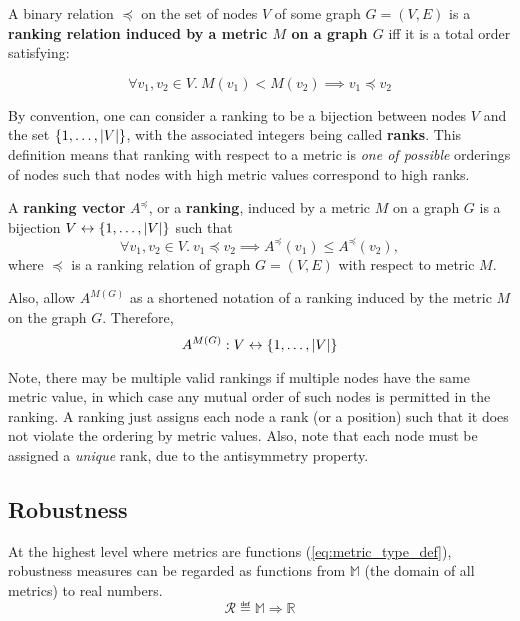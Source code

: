 \begin{definition}
    \label{def:ranking_relation}
    A binary relation $\preceq$ on the set of nodes $V$ of some graph $G = (V, E)$ is a \textbf{ranking relation induced by a metric $M$ on a graph $G$} iff it is a total order satisfying:

    \[ \forall v_1, v_2 \in V.\ M(v_1) < M(v_2) \implies v_1 \preceq v_2 \]
\end{definition}

By convention, one can consider a ranking to be a bijection between nodes $V$ and the set $\left\{1, \dots, \left\lvert V \right\rvert\right\}$, with the associated integers being called \textbf{ranks}.
This definition means that ranking with respect to a metric is \textsl{one of possible} orderings of nodes such that nodes with high metric values correspond to high ranks.

\begin{definition}
    \label{def:ranking_vector}
    A \textbf{ranking vector} $A^{\preceq}$, or a \textbf{ranking}, induced by a metric $M$ on a graph $G$ is a bijection $V \leftrightarrow \left\{1, \dots, \left\lvert V \right\rvert\right\}$ such that
    \[ \forall v_1, v_2 \in V.\ v_1 \preceq v_2 \implies A^{\preceq}(v_1) \leq A^{\preceq}(v_2), \]
    where $\preceq$ is a ranking relation of graph $G = (V, E)$ with respect to metric $M$.

    Also, allow $A^{M(G)}$ as a shortened notation of a ranking induced by the metric $M$ on the graph $G$.
    Therefore,
    \[ A^{M(G)} : V \leftrightarrow \left\{1, \dots, \left\lvert V \right\rvert\right\} \]
\end{definition}

Note, there may be multiple valid rankings if multiple nodes have the same metric value, in which case any mutual order of such nodes is permitted in the ranking.
A ranking just assigns each node a rank (or a position) such that it does not violate the ordering by metric values.
Also, note that each node must be assigned a \textsl{unique} rank, due to the antisymmetry property.

\subsection{Robustness}

At the highest level where metrics are functions (\autoref{eq:metric_type_def}), robustness measures can be regarded as functions from $\mathbb{M}$ (the domain of all metrics) to real numbers.
\begin{equation}
    \mathcal{R} \eqdef \mathbb{M} \Rightarrow \mathbb{R}
\end{equation}


